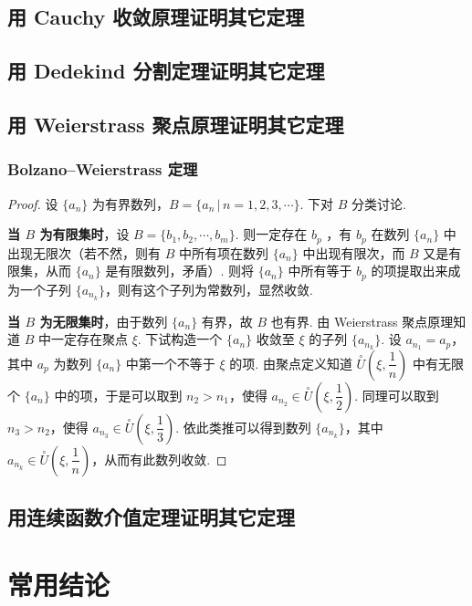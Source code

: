\documentclass[zihao=-4,linespread=1.8,UTF8,nothm]{aytony_base}
\theoremstyle{definition}
\begin{document}
\begin{appendices}
    \subsection{用 Cauchy 收敛原理证明其它定理}


    \subsection{用 Dedekind 分割定理证明其它定理}

    \subsection{用 Weierstrass 聚点原理证明其它定理}

    \subsubsection{Bolzano--Weierstrass 定理}

    \begin{proof}
        设 $\{a_n\}$ 为有界数列，$B = \{a_n\,|\,n = 1, 2, 3, \cdots\}$. 下对 $B$ 分类讨论.

        \textbf{当 $B$ 为有限集时}，设 $B = \{b_1, b_2, \cdots, b_m\}$. 则一定存在 $b_p$ ，有 $b_p$ 在数列 $\{a_n\}$ 中出现无限次（若不然，则有 $B$ 中所有项在数列 $\{a_n\}$ 中出现有限次，而 $B$ 又是有限集，从而 $\{a_n\}$ 是有限数列，矛盾）. 则将 $\{a_n\}$ 中所有等于 $b_p$ 的项提取出来成为一个子列 $\{a_{n_k}\}$，则有这个子列为常数列，显然收敛.

        \textbf{当 $B$ 为无限集时}，由于数列 $\{a_n\}$ 有界，故 $B$ 也有界. 由 Weierstrass 聚点原理知道 $B$ 中一定存在聚点 $\xi$. 下试构造一个 $\{a_n\}$ 收敛至 $\xi$ 的子列 $\{a_{n_k}\}$. 设 $a_{n_1} = a_p$，其中 $a_p$ 为数列 $\{a_n\}$ 中第一个不等于 $\xi$ 的项. 由聚点定义知道 $\overset{\circ}{U}(\xi, \dfrac{1}{n})$ 中有无限个 $\{a_n\}$ 中的项，于是可以取到 $n_2 > n_1$，使得 $a_{n_2} \in \overset{\circ}{U}(\xi, \dfrac{1}{2})$. 同理可以取到 $n_3 > n_2$，使得 $a_{n_3} \in \overset{\circ}{U}(\xi, \dfrac{1}{3})$. 依此类推可以得到数列 $\{a_{n_k}\}$，其中 $a_{n_k} \in \overset{\circ}{U}(\xi, \dfrac{1}{n})$，从而有此数列收敛.
    \end{proof}

    \subsection{用连续函数介值定理证明其它定理}

    \section{常用结论}


\end{appendices}
\end{document}
